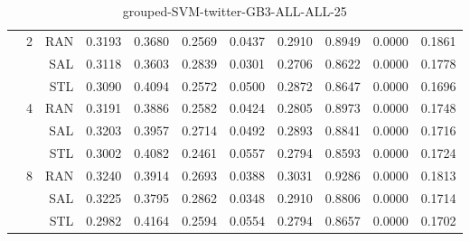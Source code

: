 \begin{center}
\begin{table}[htbp]
\begin{center}
\begin{tabular}{ | r | r | r | r | r | r | r | r | r | r | r |}
 & \multirow{3}{*}{2} & RAN & 0.3193 & 0.3680 & 0.2569 & 0.0437 & 0.2910 & 0.8949 & 0.0000 & 0.1861\\ \cline{3-11}
 &   & SAL & 0.3118 & 0.3603 & 0.2839 & 0.0301 & 0.2706 & 0.8622 & 0.0000 & 0.1778\\ \cline{3-11}
 &   & STL & 0.3090 & 0.4094 & 0.2572 & 0.0500 & 0.2872 & 0.8647 & 0.0000 & 0.1696\\ \cline{2-11}
 & \multirow{3}{*}{4} & RAN & 0.3191 & 0.3886 & 0.2582 & 0.0424 & 0.2805 & 0.8973 & 0.0000 & 0.1748\\ \cline{3-11}
 &   & SAL & 0.3203 & 0.3957 & 0.2714 & 0.0492 & 0.2893 & 0.8841 & 0.0000 & 0.1716\\ \cline{3-11}
 &   & STL & 0.3002 & 0.4082 & 0.2461 & 0.0557 & 0.2794 & 0.8593 & 0.0000 & 0.1724\\ \cline{2-11}
 & \multirow{3}{*}{8} & RAN & 0.3240 & 0.3914 & 0.2693 & 0.0388 & 0.3031 & 0.9286 & 0.0000 & 0.1813\\ \cline{3-11}
 &   & SAL & 0.3225 & 0.3795 & 0.2862 & 0.0348 & 0.2910 & 0.8806 & 0.0000 & 0.1714\\ \cline{3-11}
 &   & STL & 0.2982 & 0.4164 & 0.2594 & 0.0554 & 0.2794 & 0.8657 & 0.0000 & 0.1702\\ \cline{2-11}
\hline
\end{tabular}
\caption{grouped-SVM-twitter-GB3-ALL-ALL-25}
\end{center}
 \end{table}
\end{center}

